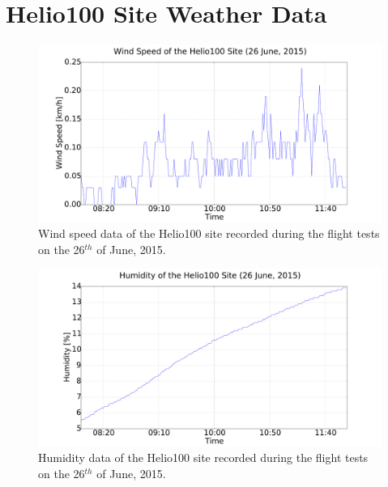 \chapter{Helio100 Site Weather Data}

\begin{figure}
  \centering
  \includegraphics[width=\textwidth, clip, trim = 90 0 160 0]{figures/appendices/wind_speed}
  \caption{Wind speed data of the Helio100 site recorded during the flight tests on the 26$^{th}$ of June, 2015.}
\end{figure}

\begin{figure}
  \centering
  \includegraphics[width=\textwidth, clip, trim = 90 0 160 0]{figures/appendices/humidity}
  \caption{Humidity data of the Helio100 site recorded during the flight tests on the 26$^{th}$ of June, 2015.}
\end{figure}

\endinput
